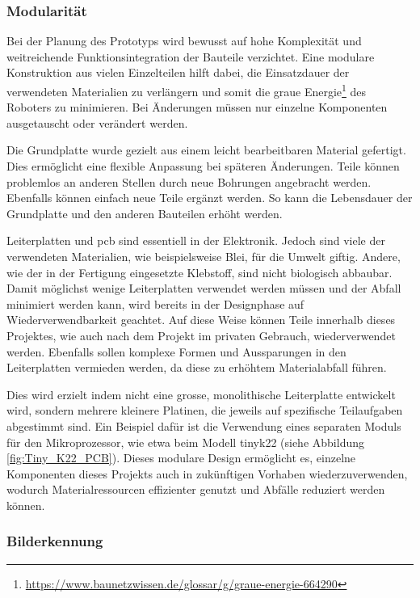 \subsubsection{Modularität}\label{nachhaltigkeit:mod}

Bei der Planung des Prototyps wird bewusst auf hohe Komplexität und weitreichende Funktionsintegration der Bauteile verzichtet. Eine modulare Konstruktion aus vielen Einzelteilen hilft dabei, die Einsatzdauer der verwendeten Materialien zu verlängern und somit die graue Energie\footnote{\url{https://www.baunetzwissen.de/glossar/g/graue-energie-664290}} des Roboters zu minimieren. Bei Änderungen müssen nur einzelne Komponenten ausgetauscht oder verändert werden.

Die Grundplatte wurde gezielt aus einem leicht bearbeitbaren Material gefertigt. Dies ermöglicht eine flexible Anpassung bei späteren Änderungen. Teile können problemlos an anderen Stellen durch neue Bohrungen angebracht werden. Ebenfalls können einfach neue Teile ergänzt werden. So kann die Lebensdauer der Grundplatte und den anderen Bauteilen erhöht werden.

Leiterplatten und \acrfull{pcb} sind essentiell in der Elektronik. Jedoch sind viele der verwendeten Materialien, wie beispielsweise Blei, für die Umwelt giftig. Andere, wie der in der Fertigung eingesetzte Klebstoff, sind nicht biologisch abbaubar. Damit möglichst wenige Leiterplatten verwendet werden müssen und der Abfall minimiert werden kann, wird bereits in der Designphase auf Wiederverwendbarkeit geachtet. Auf diese Weise können Teile innerhalb dieses Projektes, wie auch nach dem Projekt im privaten Gebrauch, wiederverwendet werden. Ebenfalls sollen komplexe Formen und Aussparungen in den Leiterplatten vermieden werden, da diese zu erhöhtem Materialabfall führen.

Dies wird erzielt indem nicht eine grosse, monolithische Leiterplatte entwickelt wird, sondern mehrere kleinere Platinen, die jeweils auf spezifische Teilaufgaben abgestimmt sind. Ein Beispiel dafür ist die Verwendung eines separaten Moduls für den Mikroprozessor, wie etwa beim Modell \gls{tinyk22} (siehe Abbildung \ref{fig:Tiny_K22_PCB}). Dieses modulare Design ermöglicht es, einzelne Komponenten dieses Projekts auch in zukünftigen Vorhaben wiederzuverwenden, wodurch Materialressourcen effizienter genutzt und Abfälle reduziert werden können.


\subsubsection{Bilderkennung}\label{nachhaltigkeit:bilderkennung}

